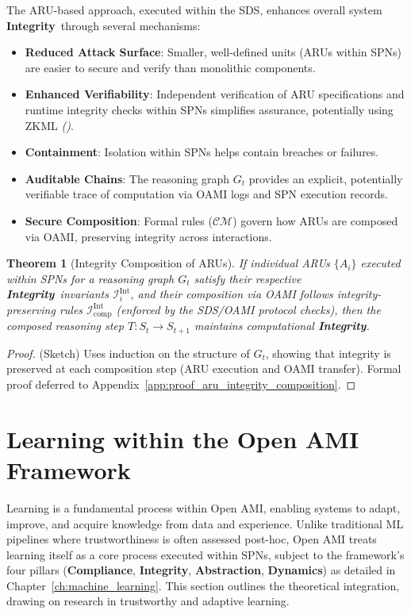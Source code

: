 \documentclass[12pt,a4paper]{report}
\renewcommand{\citep}[1]{\textit{\scriptsize{(\cite{#1})}}}
\newtheorem{theorem}{Theorem}[section]
\newcommand{\Compliance}{\textbf{Compliance}}
\newcommand{\Integrity}{\textbf{Integrity}}
\newcommand{\Abstraction}{\textbf{Abstraction}}
\newcommand{\Dynamics}{\textbf{Dynamics}}
\begin{document}
	The ARU-based approach, executed within the SDS, enhances overall system \Integrity\ through several mechanisms:
	\begin{itemize}
		\item \textbf{Reduced Attack Surface}: Smaller, well-defined units (ARUs within SPNs) are easier to secure and verify than monolithic components.
		\item \textbf{Enhanced Verifiability}: Independent verification of ARU specifications and runtime integrity checks within SPNs simplifies assurance, potentially using ZKML \citep{Peng2025ZKMLSurvey}.
		\item \textbf{Containment}: Isolation within SPNs helps contain breaches or failures.
		\item \textbf{Auditable Chains}: The reasoning graph $G_t$ provides an explicit, potentially verifiable trace of computation via OAMI logs and SPN execution records.
		\item \textbf{Secure Composition}: Formal rules ($\mathcal{CM}$) govern how ARUs are composed via OAMI, preserving integrity across interactions.
	\end{itemize}
	
	\begin{theorem}[Integrity Composition of ARUs]
		\label{thm:aru_integrity_composition}
		If individual ARUs $\{A_i\}$ executed within SPNs for a reasoning graph $G_t$ satisfy their respective \Integrity\ invariants $\mathcal{I}_i^{\text{Int}}$, and their composition via OAMI follows integrity-preserving rules $\mathcal{I}_{\text{comp}}^{\text{Int}}$ (enforced by the SDS/OAMI protocol checks), then the composed reasoning step $T: S_t \rightarrow S_{t+1}$ maintains computational \Integrity.
	\end{theorem}
	\begin{proof}
		(Sketch) Uses induction on the structure of $G_t$, showing that integrity is preserved at each composition step (ARU execution and OAMI transfer). Formal proof deferred to Appendix~\ref{app:proof_aru_integrity_composition}.
	\end{proof}
	
	\section{Learning within the Open AMI Framework}
	\label{sec:2-5-new}
	
	Learning is a fundamental process within Open AMI, enabling systems to adapt, improve, and acquire knowledge from data and experience. Unlike traditional ML pipelines where trustworthiness is often assessed post-hoc, Open AMI treats learning itself as a core process executed within SPNs, subject to the framework's four pillars (\Compliance, \Integrity, \Abstraction, \Dynamics) as detailed in Chapter~\ref{ch:machine_learning}. This section outlines the theoretical integration, drawing on research in trustworthy and adaptive learning.
	
\end{document}
